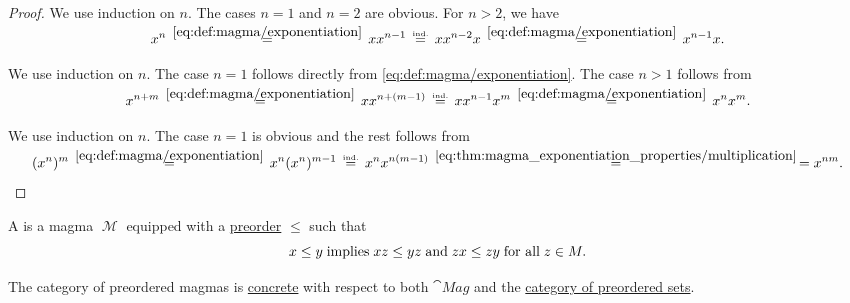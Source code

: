 \begin{proof}
   We use induction on \( n \). The cases \( n = 1 \) and \( n = 2 \) are obvious. For \( n > 2 \), we have
  \begin{equation*}
    x^n
    \reloset {\eqref{eq:def:magma/exponentiation}} =
    x x^{n-1}
    \reloset {\T{ind.}} =
    x x^{n-2} x
    \reloset {\eqref{eq:def:magma/exponentiation}} =
    x^{n-1} x.
  \end{equation*}

   We use induction on \( n \). The case \( n = 1 \) follows directly from \eqref{eq:def:magma/exponentiation}. The case \( n > 1 \) follows from
  \begin{equation*}
    x^{n + m}
    \reloset {\eqref{eq:def:magma/exponentiation}} =
    x x^{n + (m - 1)}
    \reloset {\T{ind.}} =
    x x^{n-1} x^m
    \reloset {\eqref{eq:def:magma/exponentiation}} =
    x^n x^m.
  \end{equation*}

   We use induction on \( n \). The case \( n = 1 \) is obvious and the rest follows from
  \begin{equation*}
    (x^n)^m
    \reloset {\eqref{eq:def:magma/exponentiation}} =
    x^n (x^n)^{m-1}
    \reloset {\T{ind.}} =
    x^n x^{n (m - 1)}
    \reloset {\eqref{eq:thm:magma_exponentiation_properties/multiplication}} =
    =
    x^{nm}.
  \end{equation*}
\end{proof}

\begin{definition}\label{def:preordered_magma}
  A  is a magma \( \mscrM \) equipped with a \hyperref[def:preordered_set]{preorder} \( \leq \) such that
  \begin{equation}\label{eq:def:preordered_magma/compatibility}
    x \leq y \T{implies} xz \leq yz \T{and} zx \leq zy \T{for all} z \in M.
  \end{equation}

  The category of preordered magmas is \hyperref[def:concrete_category]{concrete} with respect to both \( \cat{Mag} \) and the \hyperref[def:preordered_magma]{category of preordered sets}.
\end{definition}

